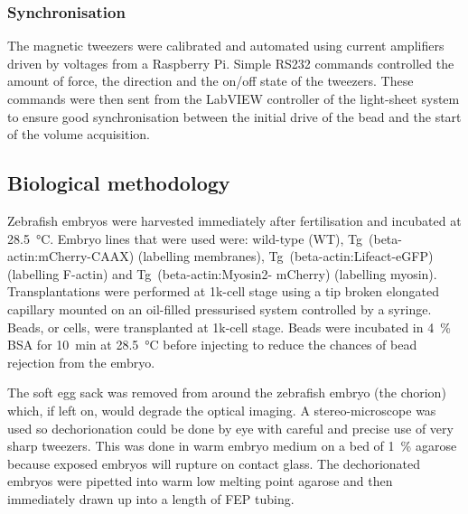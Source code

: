 \subsubsection{Synchronisation}

The magnetic tweezers were calibrated and automated using current amplifiers driven by voltages from a Raspberry Pi.
Simple \gls{RS232} commands controlled the amount of force, the direction and the on/off state of the tweezers.
These commands were then sent from the \gls{LabVIEW} controller of the \gls{light-sheet} system to ensure good synchronisation between the initial drive of the bead and the start of the volume acquisition.
%

\subsection{Biological methodology}

Zebrafish embryos were harvested immediately after fertilisation and incubated at \SI{28.5}{\celsius}.
Embryo lines that were used were: wild-type (WT), Tg~(beta-actin:mCherry-CAAX) (labelling membranes), Tg~(beta-actin:Lifeact-eGFP) (labelling F-actin) and Tg~(beta-actin:Myosin2- mCherry) (labelling myosin).
Transplantations were performed at 1k-cell stage using a tip broken elongated capillary mounted on an oil-filled pressurised system controlled by a syringe.
Beads, or cells, were transplanted at 1k-cell stage.
Beads were incubated in \SI{4}{\percent} BSA for \SI{10}{\minute} at \SI{28.5}{\celsius} before injecting to reduce the chances of bead rejection from the embryo.

The soft egg sack was removed from around the \gls{zebrafish} embryo (the \gls{chorion}) which, if left on, would degrade the optical imaging.
A stereo-microscope was used so dechorionation could be done by eye with careful and precise use of very sharp tweezers.
This was done in warm embryo medium on a bed of \SI{1}{\percent} agarose because exposed embryos will rupture on contact glass.
The dechorionated embryos were pipetted into warm low melting point agarose and then immediately drawn up into a length of \gls{FEP} tubing.

